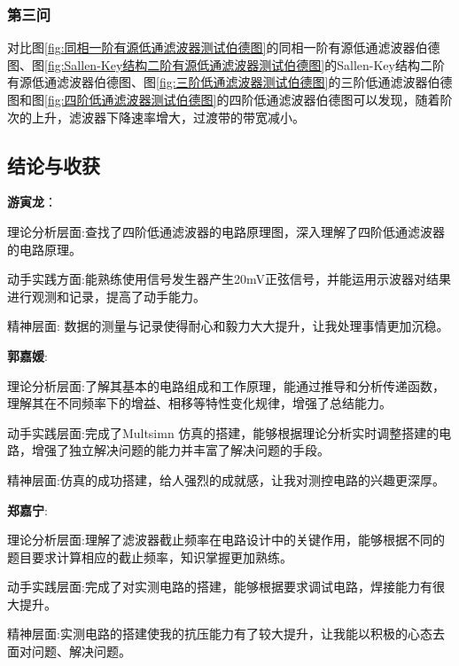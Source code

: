 \documentclass[./测控三级项目.tex]{subfiles} %
\begin{document}
		\subsubsection{第三问}
			对比图\ref{fig:同相一阶有源低通滤波器测试伯德图}的同相一阶有源低通滤波器伯德图、图\ref{fig:Sallen-Key结构二阶有源低通滤波器测试伯德图}的Sallen-Key结构二阶有源低通滤波器伯德图、图\ref{fig:三阶低通滤波器测试伯德图}的三阶低通滤波器伯德图和图\ref{fig:四阶低通滤波器测试伯德图}的四阶低通滤波器伯德图可以发现，随着阶次的上升，滤波器下降速率增大，过渡带的带宽减小。
	\subsection{结论与收获}
	\textbf{游寅龙}：\par
	理论分析层面:查找了四阶低通滤波器的电路原理图，深入理解了四阶低通滤波器的电路原理。\par
	动手实践方面:能熟练使用信号发生器产生20mV正弦信号，并能运用示波器对结果进行观测和记录，提高了动手能力。\par
	精神层面: 数据的测量与记录使得耐心和毅力大大提升，让我处理事情更加沉稳。\par
	\textbf{郭嘉媛}:\par
	理论分析层面:了解其基本的电路组成和工作原理，能通过推导和分析传递函数，理解其在不同频率下的增益、相移等特性变化规律，增强了总结能力。\par
	动手实践层面:完成了Multsimn 仿真的搭建，能够根据理论分析实时调整搭建的电路，增强了独立解决问题的能力并丰富了解决问题的手段。\par
	精神层面:仿真的成功搭建，给人强烈的成就感，让我对测控电路的兴趣更深厚。\par
	\textbf{郑嘉宁}:\par
	理论分析层面:理解了滤波器截止频率在电路设计中的关键作用，能够根据不同的题目要求计算相应的截止频率，知识掌握更加熟练。\par
	动手实践层面:完成了对实测电路的搭建，能够根据要求调试电路，焊接能力有很大提升。\par
	精神层面:实测电路的搭建使我的抗压能力有了较大提升，让我能以积极的心态去面对问题、解决问题。\par
	
	
	
	
\end{document}
